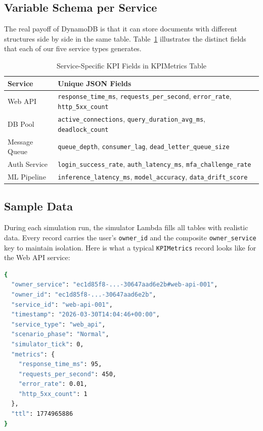 \documentclass[11pt,a4paper]{article}
\begin{document}
\subsection{Variable Schema per Service}

The real payoff of DynamoDB is that it can store documents with different structures side by side in the same table. Table~\ref{tab:service-fields} illustrates the distinct fields that each of our five service types generates.

\begin{table}[H]
\centering
\begin{tabular}{ll}
\toprule
\textbf{Service} & \textbf{Unique JSON Fields} \\
\midrule
Web API & \texttt{response\_time\_ms}, \texttt{requests\_per\_second}, \texttt{error\_rate}, \texttt{http\_5xx\_count} \\
DB Pool & \texttt{active\_connections}, \texttt{query\_duration\_avg\_ms}, \texttt{deadlock\_count} \\
Message Queue & \texttt{queue\_depth}, \texttt{consumer\_lag}, \texttt{dead\_letter\_queue\_size} \\
Auth Service & \texttt{login\_success\_rate}, \texttt{auth\_latency\_ms}, \texttt{mfa\_challenge\_rate} \\
ML Pipeline & \texttt{inference\_latency\_ms}, \texttt{model\_accuracy}, \texttt{data\_drift\_score} \\
\bottomrule
\end{tabular}
\caption{Service-Specific KPI Fields in KPIMetrics Table}
\label{tab:service-fields}
\end{table}

\subsection{Sample Data}

During each simulation run, the simulator Lambda fills all tables with realistic data. Every record carries the user's \texttt{owner\_id} and the composite \texttt{owner\_service} key to maintain isolation. Here is what a typical \texttt{KPIMetrics} record looks like for the Web API service:

\begin{lstlisting}[language=bash, caption={Sample KPIMetrics item for Web API (from DynamoDB)}]
{
  "owner_service": "ec1d85f8-...-30647aad6e2b#web-api-001",
  "owner_id": "ec1d85f8-...-30647aad6e2b",
  "service_id": "web-api-001",
  "timestamp": "2026-03-30T14:04:46+00:00",
  "service_type": "web_api",
  "scenario_phase": "Normal",
  "simulator_tick": 0,
  "metrics": {
    "response_time_ms": 95,
    "requests_per_second": 450,
    "error_rate": 0.01,
    "http_5xx_count": 1
  },
  "ttl": 1774965886
}
\end{lstlisting}
\end{document}
